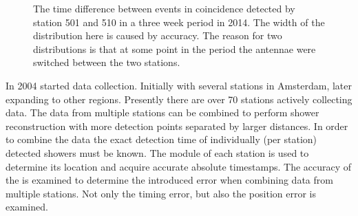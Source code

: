 \begin{figure}
    \centering
    
    \caption{ The
             time difference between events in coincidence detected by
             station 501 and 510 in a three week period in 2014. The
             width of the distribution here is caused by \gps accuracy.
             The reason for two distributions is that at some point in
             the period the \gps antennae were switched between the two
             stations.}
    \label{fig:station_offsets_501_510}
\end{figure}




In 2004 \hisparc started data collection. Initially with several stations in Amsterdam, later expanding to other regions. Presently there are over \num{70} \hisparc stations actively collecting data. The data from multiple \hisparc stations can be combined to perform shower reconstruction with more detection points separated by larger distances. In order to combine the data the exact detection time of individually (per station) detected showers must be known. The \gps module of each station is used to determine its location and acquire accurate absolute timestamps. The accuracy of the \gps is examined to determine the introduced error when combining data from multiple stations. Not only the timing error, but also the position error is examined.


